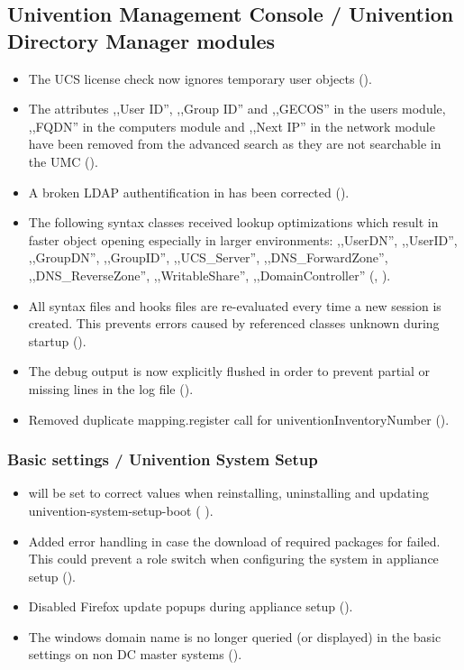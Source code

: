 \subsection{Univention Management Console / Univention Directory Manager modules}
\begin{itemize}
\item The UCS license check now ignores temporary user objects ().
\item The attributes ,,User ID'', ,,Group ID'' and ,,GECOS'' in the users module, ,,FQDN'' in the computers
  module and ,,Next IP'' in the network module have been removed from the advanced search as they
  are not searchable in the UMC ().
\item A broken LDAP authentification in  has been corrected ().
\item The following syntax classes received lookup optimizations
  which result in faster object opening especially in larger environments:
  ,,UserDN'', ,,UserID'', ,,GroupDN'', ,,GroupID'', ,,UCS\_Server'',
  ,,DNS\_ForwardZone'', ,,DNS\_ReverseZone'', ,,WritableShare'',
  ,,DomainController'' (, ).
\item All syntax files and hooks files are re-evaluated every time a new
  session is created. This prevents errors caused by referenced classes unknown
  during  startup
  ().
\item The debug output is now explicitly flushed in order to prevent
  partial or missing lines in the log file ().
\item Removed duplicate mapping.register call for univentionInventoryNumber ().
\end{itemize}

\subsubsection{Basic settings / Univention System Setup}
\begin{itemize}
\item {} will be set to correct values when reinstalling, 
uninstalling and updating univention-system-setup-boot ( ).
\item Added error handling in case the download of required packages for
 failed. This could prevent a
role switch when configuring the system in appliance setup ().
\item Disabled Firefox update popups during appliance setup ().

\item The windows domain name is no longer queried (or displayed) in the basic
settings on non  DC master systems ().

\end{itemize}

